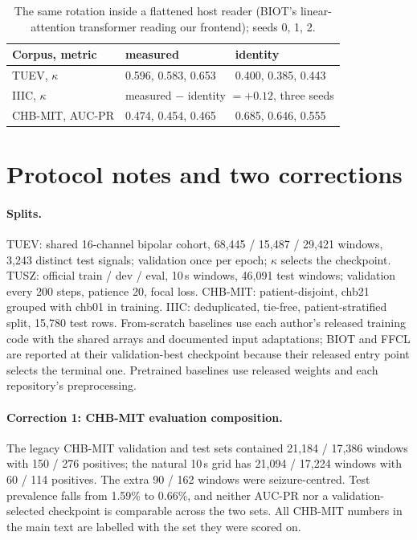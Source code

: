 \begin{table}[t]
\centering
\TableStyle
\caption{The same rotation inside a flattened host reader (BIOT's linear-attention transformer reading our frontend); seeds 0, 1, 2.}
\label{tab:biot}
\setlength{\tabcolsep}{3pt}
\begin{tabular}{@{}lll@{}}
\toprule
Corpus, metric & measured & identity \\
\midrule
TUEV, $\kappa$ & 0.596, 0.583, 0.653 & 0.400, 0.385, 0.443 \\
IIIC, $\kappa$ & \multicolumn{2}{l}{measured $-$ identity $= +0.12$, three seeds} \\
CHB-MIT, AUC-PR & 0.474, 0.454, 0.465 & 0.685, 0.646, 0.555 \\
\bottomrule
\end{tabular}
\end{table}

\section{Protocol notes and two corrections}
\label{sec:protocols}
\paragraph{Splits.}
TUEV: shared 16-channel bipolar cohort, 68,445 / 15,487 / 29,421 windows, 3,243 distinct test signals; validation once per epoch; $\kappa$ selects the checkpoint. TUSZ: official train / dev / eval, 10\,s windows, 46,091 test windows; validation every 200 steps, patience 20, focal loss. CHB-MIT: patient-disjoint, chb21 grouped with chb01 in training. IIIC: deduplicated, tie-free, patient-stratified split, 15,780 test rows. From-scratch baselines use each author's released training code with the shared arrays and documented input adaptations; BIOT and FFCL are reported at their validation-best checkpoint because their released entry point selects the terminal one. Pretrained baselines use released weights and each repository's preprocessing.

\paragraph{Correction 1: CHB-MIT evaluation composition.}
The legacy CHB-MIT validation and test sets contained 21,184 / 17,386 windows with 150 / 276 positives; the natural 10\,s grid has 21,094 / 17,224 windows with 60 / 114 positives. The extra 90 / 162 windows were seizure-centred. Test prevalence falls from 1.59\% to 0.66\%, and neither AUC-PR nor a validation-selected checkpoint is comparable across the two sets. All CHB-MIT numbers in the main text are labelled with the set they were scored on.

